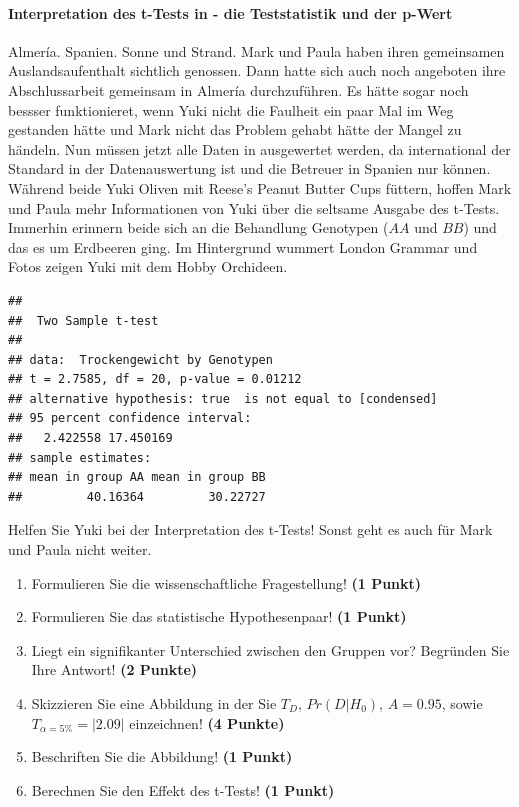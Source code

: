 \documentclass[a4paper, 9pt]{scrartcl}\usepackage[]{graphicx}\usepackage[]{xcolor}
\makeatletter
\newenvironment{kframe}{%
 \def\at@end@of@kframe{}%
 \ifinner\ifhmode%
  \def\at@end@of@kframe{\end{minipage}}%
  \begin{minipage}{\columnwidth}%
 \fi\fi%
 \def\FrameCommand##1{\hskip\@totalleftmargin \hskip-\fboxsep
 \colorbox{shadecolor}{##1}\hskip-\fboxsep
     \hskip-\linewidth \hskip-\@totalleftmargin \hskip\columnwidth}%
 \MakeFramed {\advance\hsize-\width
   \@totalleftmargin\z@ \linewidth\hsize
   \@setminipage}}%
 {\par\unskip\endMakeFramed%
 \at@end@of@kframe}
\newenvironment{knitrout}{}{} %
\makeatother
\begin{document}
\paragraph{Interpretation des t-Tests in \Rlogo - die Teststatistik und der p-Wert}


Almería. Spanien. Sonne und Strand. Mark und Paula haben ihren gemeinsamen Auslandsaufenthalt sichtlich genossen. Dann hatte sich auch noch angeboten ihre Abschlussarbeit gemeinsam in Almería durchzuführen. Es hätte sogar noch bessser funktionieret, wenn Yuki nicht die Faulheit ein paar Mal im Weg gestanden hätte und Mark nicht das Problem gehabt hätte der Mangel zu händeln. Nun müssen jetzt alle Daten in \Rlogo ausgewertet werden, da \Rlogo international der Standard in der Datenauswertung ist und die Betreuer in Spanien nur \Rlogo können. Während beide Yuki Oliven mit Reese's Peanut Butter Cups füttern, hoffen Mark und Paula mehr Informationen von Yuki über die seltsame \Rlogo Ausgabe des t-Tests. Immerhin erinnern beide sich an die Behandlung Genotypen ($AA$ und $BB$) und das es um Erdbeeren ging. Im Hintergrund wummert London Grammar und Fotos zeigen Yuki mit dem Hobby Orchideen.

\begin{knitrout}
\color{fgcolor}\begin{kframe}
\begin{verbatim}
## 
## 	Two Sample t-test
## 
## data:  Trockengewicht by Genotypen
## t = 2.7585, df = 20, p-value = 0.01212
## alternative hypothesis: true  is not equal to [condensed]
## 95 percent confidence interval:
##   2.422558 17.450169
## sample estimates:
## mean in group AA mean in group BB 
##         40.16364         30.22727
\end{verbatim}
\end{kframe}
\end{knitrout}

Helfen Sie Yuki bei der Interpretation des t-Tests! Sonst geht es auch für Mark und Paula nicht weiter.
  
\begin{enumerate}
  \item Formulieren Sie die wissenschaftliche Fragestellung! \textbf{(1 Punkt)}
  \item Formulieren Sie das statistische Hypothesenpaar! \textbf{(1 Punkt)}
\item Liegt ein signifikanter Unterschied zwischen den Gruppen vor? Begründen Sie Ihre Antwort! \textbf{(2 Punkte)}
\item Skizzieren Sie eine Abbildung in der Sie $T_{D}$, $Pr(D|H_0)$, $A=0.95$, sowie $T_{\alpha=5\%} = |2.09|$ einzeichnen! \textbf{(4 Punkte)}
\item Beschriften Sie die Abbildung! \textbf{(1 Punkt)}  
\item Berechnen Sie den Effekt des t-Tests! \textbf{(1 Punkt)}
\end{enumerate} 
\clearpage
\end{document}
